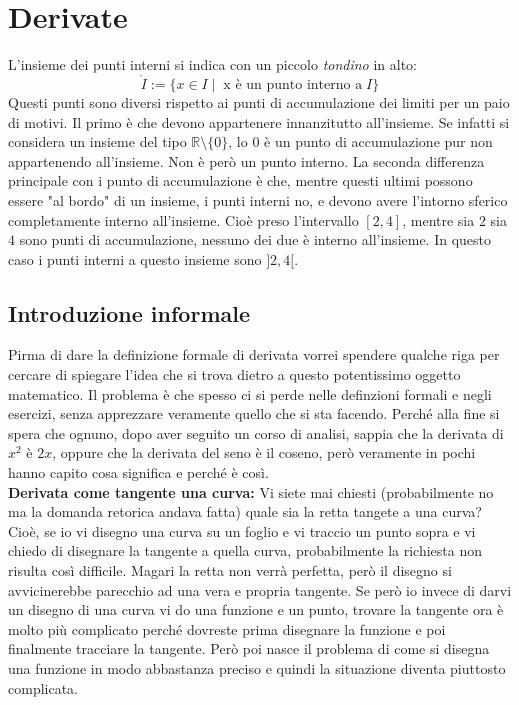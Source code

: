 \section{Derivate}

L'insieme dei punti interni si indica con un piccolo \textit{tondino} in alto:
\begin{equation*}
	\mathring{I} := \{x \in I \; | \;\; \text{x è un punto interno a}\;I\} 
\end{equation*}
Questi punti sono diversi rispetto ai punti di accumulazione dei limiti per un paio di motivi. Il primo è che devono appartenere innanzitutto all'insieme. Se infatti si considera un insieme del tipo $\mathbb{R} \setminus \{0\}$, lo $0$ è un punto di accumulazione pur non appartenendo all'insieme. Non è però un punto interno. La seconda differenza principale con i punto di accumulazione è che, mentre questi ultimi possono essere "al bordo" di un insieme, i punti interni no, e devono avere l'intorno sferico completamente interno all'insieme. Cioè preso l'intervallo $[2, 4]$, mentre sia $2$ sia $4$ sono punti di accumulazione, nessuno dei due è interno all'insieme. In questo caso i punti interni a questo insieme sono $]2,4[$.

\subsection{Introduzione informale}
Pirma di dare la definizione formale di derivata vorrei spendere qualche riga per cercare di spiegare l'idea che si trova dietro a questo potentissimo oggetto matematico. Il problema è che spesso ci si perde nelle definzioni formali e negli esercizi, senza apprezzare veramente quello che si sta facendo. Perché alla fine si spera che ognuno, dopo aver seguito un corso di analisi, sappia che la derivata di $x^2$ è $2x$, oppure che la derivata del seno è il coseno, però veramente in pochi hanno capito cosa significa e perché è così.\\

\textbf{Derivata come tangente una curva:} Vi siete mai chiesti (probabilmente no ma la domanda retorica andava fatta) quale sia la retta tangete a una curva? Cioè, se io vi disegno una curva su un foglio e vi traccio un punto sopra e vi chiedo di disegnare la tangente a quella curva, probabilmente la richiesta non risulta così difficile. Magari la retta non verrà perfetta, però il disegno si avvicinerebbe parecchio ad una vera e propria tangente. Se però io invece di darvi un disegno di una curva vi do una funzione e un punto, trovare la tangente ora è molto più complicato perché dovreste prima disegnare la funzione e poi finalmente tracciare la tangente. Però poi nasce il problema di come si disegna una funzione in modo abbastanza preciso e quindi la situazione diventa piuttosto complicata. 

